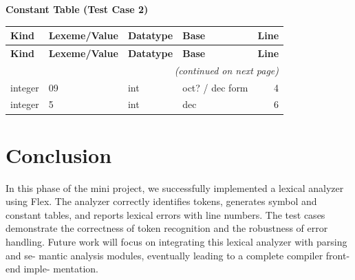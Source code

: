 \documentclass[12pt,a4paper]{article}
\begin{document}
\noindent\textbf{Constant Table (Test Case 2)}
\begin{center}
\begin{longtable}{@{} l l l l r @{}}\toprule
\textbf{Kind} & \textbf{Lexeme/Value} & \textbf{Datatype} & \textbf{Base} & \textbf{Line} \\
\midrule
\endfirsthead
\toprule
\textbf{Kind} & \textbf{Lexeme/Value} & \textbf{Datatype} & \textbf{Base} & \textbf{Line} \\
\midrule
\endhead
\midrule \multicolumn{5}{r}{\emph{(continued on next page)}}\\
\midrule
\endfoot
\bottomrule
\endlastfoot
integer       & 09            & int     & oct? / dec form & 4 \\
integer       & 5             & int     & dec             & 6 \\
\end{longtable}
\end{center}

\vspace{0.5cm}

\section{Conclusion}
In this phase of the mini project, we successfully implemented a lexical analyzer using Flex. The analyzer correctly identifies tokens, generates symbol and constant
tables, and reports lexical errors with line numbers. The test cases demonstrate the
correctness of token recognition and the robustness of error handling.
Future work will focus on integrating this lexical analyzer with parsing and se-
mantic analysis modules, eventually leading to a complete compiler front-end imple-
mentation.
\end{document}
